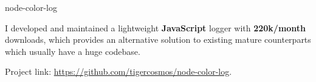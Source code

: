 \begin{cventries}
  \cventry
    {} %
    {node-color-log} %
    {} %
    {} %
    {
      \vspace{-2mm}
      \begin{cvitems} %
        \item {
          I developed and maintained a lightweight \textbf{JavaScript} logger with \textbf{220k/month} downloads,
          which provides an alternative solution to existing mature counterparts which usually have a huge codebase.
        }
        \item {Project link: \url{https://github.com/tigercosmos/node-color-log}.}
      \end{cvitems}
    }
    \vspace{-2mm}

\end{cventries}
